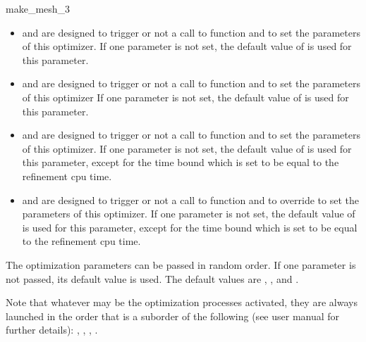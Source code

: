\begin{ccRefFunction}{make_mesh_3}
\begin{itemize}
\item {} and  are designed to
  trigger or not a call to  function and to set the
  parameters of this optimizer. If one parameter is not set, the default value of
   is used for this parameter.
\item {} and  are designed to
  trigger or not a call to  function and 
to set the  parameters of this optimizer
 If one parameter is not set, the default value of
   is used for this parameter.
\item {} and  are designed  to
  trigger or not a call to  function and 
to set the  parameters of this optimizer. If one parameter is not set, the default value of
   is used for this parameter, except for the time bound which is set to be
  equal to the refinement cpu time.
\item {} and  are designed to
  trigger or not a call to  function and  to override to set the
  parameters of this optimizer. If one parameter is not set, the default value of
   is used for this parameter, except for the time bound which is set to be
  equal to the refinement cpu time.
\end{itemize}

The optimization parameters can be passed in random order. If one parameter
is not passed, its default value is used. The default values are
, ,  and .

Note that whatever may be the optimization processes activated,
they are always launched in the order that is a suborder 
of the following (see user manual for further details):
, , , .



\ccSeeAlso

 \\
 \\
 \\
 \\
 \\
 \\
 \\
 \\
 \\
 \\
 \\
 \\
 \\



\end{ccRefFunction}

\ccRefPageEnd

